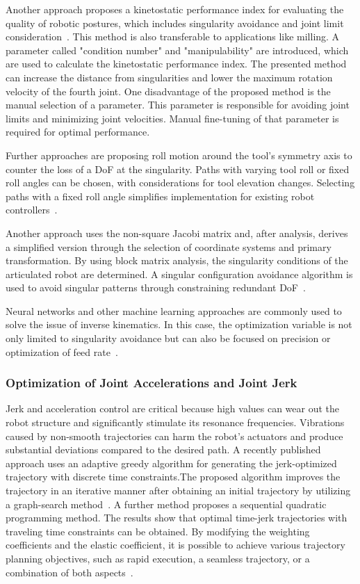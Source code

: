 \documentclass[conference]{IEEEtran}
\begin{document}
Another approach proposes a kinetostatic performance index for evaluating the quality of robotic postures, which includes singularity avoidance and joint limit consideration~\cite{Huo.2008}. This method is also transferable to applications like milling. A parameter called "condition number" and "manipulability" are introduced, which are used to calculate the kinetostatic performance index. The presented method can increase the distance from singularities and lower the maximum rotation velocity of the fourth joint. One disadvantage of the proposed method is the manual selection of a parameter. This parameter is responsible for avoiding joint limits and minimizing joint velocities. Manual fine-tuning of that parameter is required for optimal performance. 

Further approaches are proposing roll motion around the tool's symmetry axis to counter the loss of a DoF at the singularity. Paths with varying tool roll or fixed roll angles can be chosen, with considerations for tool elevation changes. Selecting paths with a fixed roll angle simplifies implementation for existing robot controllers~\cite{Milenkovic.2021}.

Another approach uses the non-square Jacobi matrix and, after analysis, derives a simplified version through the selection of coordinate systems and primary transformation. By using block matrix analysis, the singularity conditions of the articulated robot are determined.
A singular configuration avoidance algorithm is used to avoid singular patterns through constraining redundant DoF~\cite{Shi.2021}.

Neural networks and other machine learning approaches are commonly used to solve the issue of inverse kinematics. In this case, the optimization variable is not only limited to singularity avoidance but can also be focused on precision or optimization of feed rate~\cite{Wei.2014}.\newline

\subsubsection{Optimization of Joint Accelerations and Joint Jerk}

Jerk and acceleration control are critical because high values can wear out the robot structure and significantly stimulate its resonance frequencies. Vibrations caused by non-smooth trajectories can harm the robot's actuators and produce substantial deviations compared to the desired path. A recently published approach uses an adaptive greedy algorithm for generating the jerk-optimized trajectory with discrete time constraints.\newline The proposed algorithm improves the trajectory in an iterative manner after obtaining an initial trajectory by utilizing a graph-search method~\cite{Dai.2020}.
A further method proposes a sequential quadratic programming method. The results show that optimal time-jerk trajectories with traveling time constraints can be obtained. By modifying the weighting coefficients and the elastic coefficient, it is possible to achieve various trajectory planning objectives, such as rapid execution, a seamless trajectory, or a combination of both aspects~\cite{Jiang.2017}. 
\end{document}
